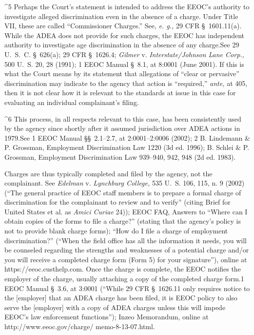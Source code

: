 ^5 Perhaps the Court's statement is intended to address the EEOC's
authority to investigate alleged discrimination even in the absence
of a charge. Under Title VII, these are called ``Commissioner
Charges.'' See, \emph{e. g.,} 29 CFR \S~1601.11(a). While the
ADEA does not provide for such charges, the EEOC has independent
authority to investigate age discrimination in the absence of any
charge.See 29 U.~S.~C. \S~626(a); 29 CFR \S~1626.4; \emph{Gilmer}
v. \emph{Interstate/Johnson Lane Corp.,} 500 U.~S. 20, 28 (1991); 1 EEOC
Manual \S~8.1, at 8:0001 (June 2001). If this is what the Court
means by its statement that allegations of ``clear or pervasive''
discrimination may indicate to the agency that action is ``required,''
\emph{ante,} at 405, then it is not clear how it is relevant to
the standards at issue in this case for evaluating an individual
complainant's filing.

^6 This process, in all respects relevant to this case, has
been consistently used by the agency since shortly after it
assumed jurisdiction over ADEA actions in 1979.See 1 EEOC Manual
\S\S~2.1--2.7, at 2:0001--2:0006 (2002); 2 B. Lindemann \& P.
Grossman, Employment Discrimination Law 1220 (3d ed. 1996); B. Schlei \&
P. Grossman, Employment Discrimination Law 939--940, 942, 948 (2d ed.
1983).

  Charges are thus typically completed and filed by the agency, not the
complainant. See \emph{Edelman} v. \emph{Lynchburg College,} 535 U.~S. 106,
115, n. 9 (2002) (``The general practice of EEOC staff members is to
prepare a formal charge of discrimination for the complainant to review
and to verify'' (citing Brief for United States et al. as \emph{Amici
Curiae} 24)); EEOC FAQ, Answers to ``Where can I obtain copies of the
forms to file a charge?'' (stating that the agency's policy is not
to provide blank charge forms); ``How do I file a charge of employment
discrimination?'' (``When the field office has all the information it
needs, you will be counseled regarding the strengths and weaknesses of a
potential charge and/or you will receive a completed charge form (Form
5) for your signature''), online at https://eeoc.custhelp.com. Once
the charge is complete, the EEOC notifies the employer of the charge,
usually attaching a copy of the completed charge form.1 EEOC Manual
\S~3.6, at 3:0001 (``While 29 CFR \S~1626.11 only requires notice to
the [employer] that an ADEA charge has been filed, it is EEOC policy to
also serve the [employer] with a copy of ADEA charges unless this will
impede EEOC's law enforcement functions''); \newpage  Inzeo Memorandum,
online at http://www.eeoc.gov/charge/ memo-8-13-07.html.

